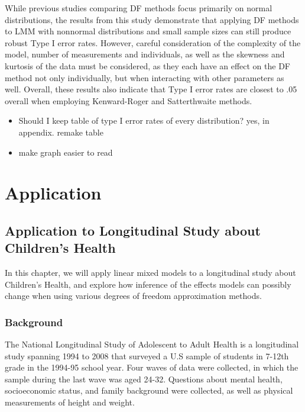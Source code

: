 \documentclass[12pt, twoside]{amherstthesis}
\providecommand{\tightlist}{%
  \setlength{\itemsep}{0pt}\setlength{\parskip}{0pt}}
\begin{document}
While previous studies comparing DF methods focus primarily on normal distributions, the results from this study demonstrate that applying DF methods to LMM with nonnormal distributions and small sample sizes can still produce robust Type I error rates. However, careful consideration of the complexity of the model, number of measurements and individuals, as well as the skewness and kurtosis of the data must be considered, as they each have an effect on the DF method not only individually, but when interacting with other parameters as well. Overall, these results also indicate that Type I error rates are closest to .05 overall when employing Kenward-Roger and Satterthwaite methods.
\begin{itemize}
\tightlist
\item
  Should I keep table of type I error rates of every distribution? yes, in appendix. remake table
\item
  make graph easier to read
\end{itemize}
\hypertarget{math-sci}{%
\chapter{Application}\label{math-sci}}

\hypertarget{application-to-longitudinal-study-about-childrens-health}{%
\section{Application to Longitudinal Study about Children's Health}\label{application-to-longitudinal-study-about-childrens-health}}

In this chapter, we will apply linear mixed models to a longitudinal study about Children's Health, and explore how inference of the effects models can possibly change when using various degrees of freedom approximation methods.

\hypertarget{background}{%
\subsection{Background}\label{background}}

The National Longitudinal Study of Adolescent to Adult Health is a longitudinal study spanning 1994 to 2008 that surveyed a U.S sample of students in 7-12th grade in the 1994-95 school year. Four waves of data were collected, in which the sample during the last wave was aged 24-32. Questions about mental health, socioeconomic status, and family background were collected, as well as physical measurements of height and weight.
\end{document}
